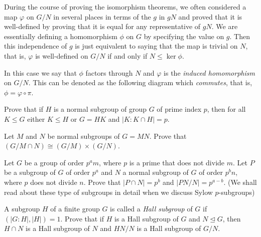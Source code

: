 During the course of proving the isomorphism theorems, we often considered a map $\varphi$ on $G/N$ in several places in terms of the $g$ in $gN$ and proved that it is well-defined by proving that it is equal for any representative of $gN$. We are essentially defining a homomorphism $\phi$ on $G$ by specifying the value on $g$. Then this independence of $g$ is just equivalent to saying that the map is trivial on $N$, that is, $\varphi$ is well-defined on $G/N$ if and only if $N\leq\ker\phi$.

In this case we say that $\phi$ factors through $N$ and $\varphi$ is the \textit{induced homomorphism} on $G/N$. This can be denoted as the following diagram which \textit{commutes}, that is, $\phi=\varphi\circ\pi$.
\begin{center}
\end{center}

\begin{exercise}
    Prove that if $H$ is a normal subgroup of group $G$ of prime index $p$, then for all $K\leq G$ either $K\leq H$ or $G=HK$ and $|K:K\cap H|=p$.
\end{exercise}

\begin{exercise}
    Let $M$ and $N$ be normal subgroups of $G=MN$. Prove that $(G/M\cap N)\cong (G/M)\times (G/N)$.
\end{exercise}

\begin{exercise}
    Let $G$ be a group of order $p^a m$, where $p$ is a prime that does not divide $m$. Let $P$ be a subgroup of $G$ of order $p^a$ and $N$ a normal subgroup of $G$ of order $p^bn$, where $p$ does not divide $n$. Prove that $|P\cap N|=p^b$ and $|PN/N|=p^{a-b}$. (We shall read about these type of subgroups in detail when we discuss Sylow $p$-subgroups)
\end{exercise}

\begin{exercise}
    A subgroup $H$ of a finite group $G$ is called a \textit{Hall subgroup} of $G$ if $(|G:H|,|H|)=1$. Prove that if $H$ is a Hall subgroup of $G$ and $N\unlhd G$, then $H\cap N$ is a Hall subgroup of $N$ and $HN/N$ is a Hall subgroup of $G/N$.
\end{exercise}

\clearpage